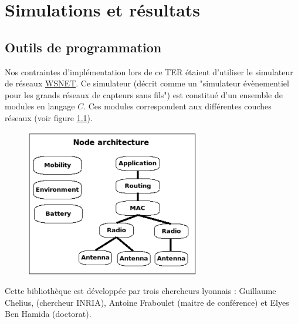 \chapter{Simulations et r\'esultats}\label{simu}

\section{Outils de programmation}
Nos contraintes d'implémentation lors de ce TER étaient d'utiliser le simulateur de réseaux \href{http://wsnet.gforge.inria.fr/}{WSNET}. Ce simulateur (décrit comme un "simulateur évènementiel pour les grands réseaux de capteurs sans fils") est constitué d'un ensemble de modules en langage $C$. Ces modules correspondent aux différentes couches réseaux (voir figure \ref{structWSNET}).
\begin{figure}[h]
\centering
\includegraphics[scale=1]{Simus/wsnet-node}
\label{structWSNET}
\end{figure}
Cette bibliothèque est développée par trois chercheurs lyonnais : Guillaume Chelius, (chercheur INRIA), Antoine Fraboulet (maitre de conférence) et Elyes Ben Hamida (doctorat).


